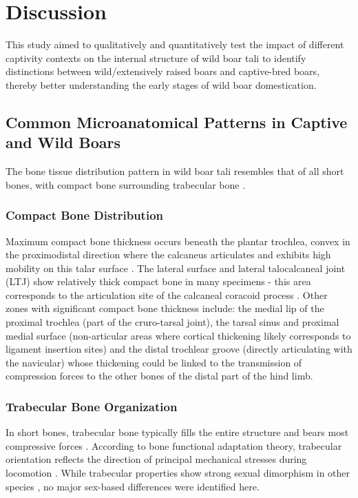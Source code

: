 \documentclass[12pt,a4paper]{article}
\begin{document}
\section{Discussion}
This study aimed to qualitatively and quantitatively test the impact of different captivity contexts on the internal structure of wild boar tali to identify distinctions between wild/extensively raised boars and captive-bred boars, thereby better understanding the early stages of wild boar domestication.

\subsection{Common Microanatomical Patterns in Captive and Wild Boars}
The bone tissue distribution pattern in wild boar tali resembles that of all short bones, with compact bone surrounding trabecular bone \cite{curreyChapterCancellousBone2013}.

\subsubsection{Compact Bone Distribution}
Maximum compact bone thickness occurs beneath the plantar trochlea, convex in the proximodistal direction where the calcaneus articulates and exhibits high mobility on this talar surface \cite{baroneIVArticulationsJambe2020t}. The lateral surface and lateral talocalcaneal joint (LTJ) show relatively thick compact bone in many specimens - this area corresponds to the articulation site of the calcaneal coracoid process \cite{baroneIVArticulationsJambe2020t}. Other zones with significant compact bone thickness include: the medial lip of the proximal trochlea (part of the cruro-tarsal joint), the tarsal sinus and proximal medial surface (non-articular areas where cortical thickening likely corresponds to ligament insertion sites) and the distal trochlear groove (directly articulating with the navicular) whose thickening could be linked to the transmission of compression forces to the other bones of the distal part of the hind limb.

\subsubsection{Trabecular Bone Organization}
In short bones, trabecular bone typically fills the entire structure and bears most compressive forces \cite{curreyChapterCancellousBone2013, silvaModelingMechanicalBehavior1997}. According to bone functional adaptation theory, trabecular orientation reflects the direction of principal mechanical stresses \cite{rouxZuchtendeKampfTeile1881, wolffLawBoneRemodelling1986} during locomotion \cite{curreyBonesStructureMechanics2013b}. While trabecular properties show strong sexual dimorphism in other species \cite{macdonaldAgerelatedPatternsTrabecular2011, parfittAgerelatedStructuralChanges1984}, no major sex-based differences were identified here.
\end{document}
